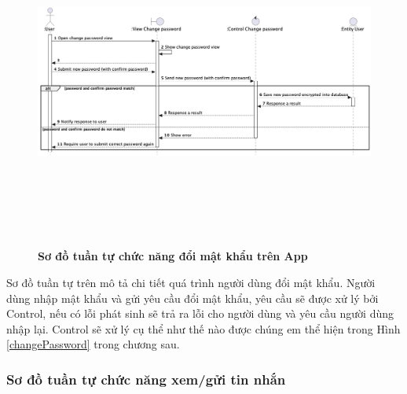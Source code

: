   \begin{figure}[H]
        \centering
        \includegraphics[width=16cm,height=11cm]{Images/mobile_app/change_password.png}
        \caption[Sơ đồ tuần tự chức năng đổi mật khẩu trên App]{\bfseries \fontsize{12pt}{0pt}
        \selectfont Sơ đồ tuần tự chức năng đổi mật khẩu trên App}
        \label{change_password} %
  \end{figure}

  Sơ đồ tuần tự trên mô tả chi tiết quá trình người dùng đổi mật khẩu. Người dùng nhập mật khẩu và gửi yêu cầu đổi mật khẩu, 
  yêu cầu sẽ được xử lý bởi Control, nếu có lỗi phát sinh sẽ trả ra lỗi cho người dùng và yêu cầu người dùng nhập lại. Control
  sẽ xử lý cụ thể như thế nào được chúng em thể hiện trong Hình \ref{changePassword} trong chương sau.

\subsubsection{Sơ đồ tuần tự chức năng xem/gửi tin nhắn}
\mbox{}

